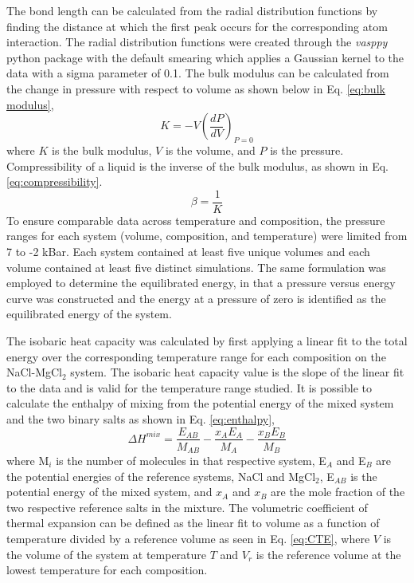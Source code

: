 \documentclass[review]{elsarticle}
\begin{document}
The bond length can be calculated from the radial distribution functions by finding the distance at which the first peak occurs for the corresponding atom interaction. The radial distribution functions were created through the \textit{vasppy} python package with the default smearing which applies a Gaussian kernel to the data with a sigma parameter of 0.1. The bulk modulus can be calculated from the change in pressure with respect to volume as shown below in Eq. \ref{eq:bulk modulus},
\begin{equation}
\label{eq:bulk modulus}
K = -V {(\frac{dP}{dV})}_{P=0}
\end{equation} where $K$ is the bulk modulus, $V$ is the volume, and $P$ is the pressure. Compressibility of a liquid is the inverse of the bulk modulus, as shown in Eq. \ref{eq:compressibility}. 
\begin{equation}
\label{eq:compressibility}
\beta = \frac{1}{K}
\end{equation}
To ensure comparable data across temperature and composition, the pressure ranges for each system (volume, composition, and temperature) were limited from 7 to -2 kBar. Each system contained at least five unique volumes and each volume contained at least five distinct simulations. The same formulation was employed to determine the equilibrated energy, in that a pressure versus energy curve was constructed and the energy at a pressure of zero is identified as the equilibrated energy of the system. 


The isobaric heat capacity was calculated by first applying a linear fit to the total energy over the corresponding temperature range for each composition on the NaCl-MgCl$_2$ system. The isobaric heat capacity value is the slope of the linear fit to the data and is valid for the temperature range studied. It is possible to calculate the enthalpy of mixing from the potential energy of the mixed system and the two binary salts as shown in Eq. \ref{eq:enthalpy},
\begin{equation}
 \label{eq:enthalpy}
 \Delta H^{mix} = \frac{E_{AB}}{M_{AB}} - \frac{x_A E_A}{M_A} - \frac{x_B E_B}{M_B}
\end{equation}
where M$_i$ is the number of molecules in that respective system, E$_A$ and E$_B$ are the potential energies of the reference systems, NaCl and MgCl$_2$, E$_{AB}$ is the potential energy of the mixed system, and $x_A$ and $x_B$ are the mole fraction of the two respective reference salts in the mixture. The volumetric coefficient of thermal expansion can be defined as the linear fit to volume as a function of temperature divided by a reference volume as seen in Eq. \ref{eq:CTE}, where $V$ is the volume of the system at temperature $T$ and $V_r$ is the reference volume at the lowest temperature for each composition.
\end{document}

